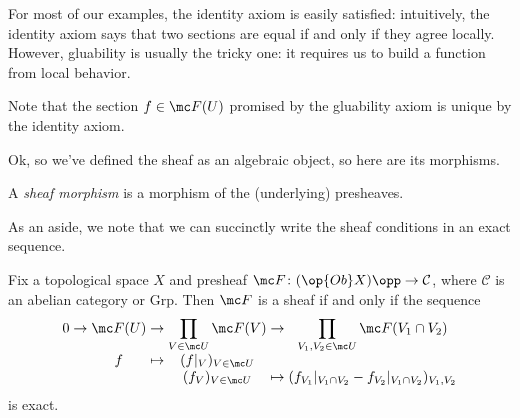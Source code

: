 \documentclass[../notes.tex]{subfiles}
\begin{document}
\begin{remark}
	For most of our examples, the identity axiom is easily satisfied: intuitively, the identity axiom says that two sections are equal if and only if they agree locally. However, gluability is usually the tricky one: it requires us to build a function from local behavior.
\end{remark}
\begin{remark}
	Note that the section $f\in\mc F(U)$ promised by the gluability axiom is unique by the identity axiom.
\end{remark}
Ok, so we've defined the sheaf as an algebraic object, so here are its morphisms.
\begin{definition}
	A \textit{sheaf morphism} is a morphism of the (underlying) presheaves.
\end{definition}
As an aside, we note that we can succinctly write the sheaf conditions in an exact sequence.
\begin{lemma}
	Fix a topological space $X$ and presheaf $\mc F\colon(\op{Ob}X)\opp\to\mathcal C$, where $\mathcal C$ is an abelian category or $\mathrm{Grp}$. Then $\mc F$ is a sheaf if and only if the sequence
	\begin{equation}
		\arraycolsep=1.4pt\begin{array}{cccccccccccc}
			0 &\to& \mc F(U) &\to& \displaystyle\prod_{V\in\mc U}\mc F(V) &\to& \displaystyle\prod_{V_1,V_2\in\mc U}\mc F(V_1\cap V_2) \\
			  &   & f        &\mapsto& (f|_V)_{V\in\mc U} \\
			  &   &          &       & (f_V)_{V\in\mc U} &\mapsto& (f_{V_1}|_{V_1\cap V_2}-f_{V_2}|_{V_1\cap V_2})_{V_1,V_2}
		\end{array} \label{eq:sheafles}
	\end{equation}
	is exact.
\end{lemma}
\end{document}
